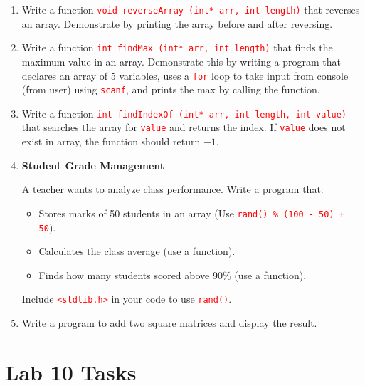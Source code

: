 \documentclass[12pt]{article}
\begin{document}
\begin{enumerate}

\item Write a function \textcolor{red}{\texttt{void reverseArray (int* arr, int length)}} that reverses an array. Demonstrate by printing the array before and after reversing.

\item Write a function \textcolor{red}{\texttt{int findMax (int* arr, int length)}} that finds the maximum value in an array. Demonstrate this by writing a program that declares an array of 
5 variables, uses a \textcolor{red}{\texttt{for}} loop to take input from console (from user) using \textcolor{red}{\texttt{scanf}}, and prints the max by calling the function.

\item Write a function \textcolor{red}{\texttt{int findIndexOf (int* arr, int length, int value)}} that searches the array for \textcolor{red}{\texttt{value}} and returns the index. If 
\textcolor{red}{\texttt{value}} does not exist in array, the function should return $-1$.

\item \textbf{Student Grade Management}

A teacher wants to analyze class performance. Write a program that:

\begin{itemize}
    \item Stores marks of 50 students in an array (Use \textcolor{red}{\texttt{rand() \% (100 - 50) + 50}}).
    \item Calculates the class average (use a function).
    \item Finds how many students scored above 90\% (use a function).
\end{itemize}

Include \textcolor{red}{\texttt{<stdlib.h>}} in your code to use \textcolor{red}{\texttt{rand()}}.

\item Write a program to add two square matrices and display the result. 

\end{enumerate}


\newpage
{}
\section*{Lab 10 Tasks}
\end{document}
